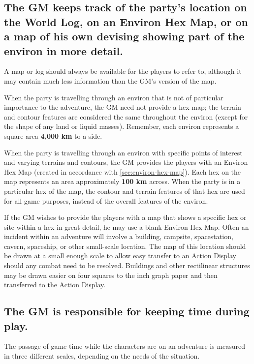 \subsection[Tracking Location]{The GM keeps track of the party's
  location on the World Log, on  an Environ Hex Map, or on a map of
  his own devising showing part of  the environ in more detail.} 
\label{sec:gm-track-location}



A map or log should always be available for the players to refer to,
although it may contain much less information than the GM's version of
the map.

When the party is travelling through an environ that is not of
particular importance to the adventure, the GM need not provide a hex
map; the terrain and contour features are considered the same
throughout the environ (except for the shape of any land or liquid
masses). Remember, each environ represents a square area \textbf{4,000
  km} to a side.

When the party is travelling through an environ with specific points
of interest and varying terrains and contours, the GM provides the
players with an Environ Hex Map (created in accordance with
\ref{sec:environ-hex-map}). Each hex on the map represents an area
approximately \textbf{100 km} across. When the party is in a
particular hex of the map, the contour and terrain features of that
hex are used for all game purposes, instead of the overall features of
the environ.

If the GM wishes to provide the players with a map that shows a
specific hex or site within a hex in great detail, he may use a blank
Environ Hex Map. Often an incident within an adventure will involve a
building, campsite, spacestation, cavern, spaceship, or other
small-scale location. The map of this location should be drawn at a
small enough scale to allow easy transfer to an Action Display should
any combat need to be resolved. Buildings and other rectilinear
structures may be drawn easier on four squares to the inch graph paper
and then transferred to the Action Display.

\subsection[Keeping Time]{The GM is responsible for keeping time
  during play.}
\label{sec:keeping-time}



The passage of game time while the characters are on an adventure is
measured in three different scales, depending on the needs of the
situation.

